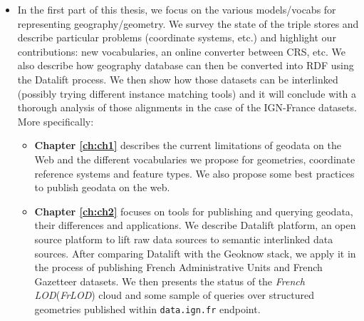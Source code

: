 \begin{itemize}
\item In the first part of this thesis, we focus on the various models/vocabs for representing geography/geometry. We survey the state of the triple stores and describe particular problems (coordinate systems, etc.) and highlight our contributions: new vocabularies, an online converter between CRS, etc. We also describe how geography database can then be converted into RDF using the Datalift process. We then show how those datasets can be interlinked (possibly trying different instance matching tools) and it will conclude with a thorough analysis of those alignments in the case of the IGN-France datasets. More specifically:

 \begin{itemize}
  \item \textbf{Chapter \ref{ch:ch1}} describes the current limitations of geodata on the Web and the different vocabularies we propose for geometries, coordinate reference systems and feature  types. We also propose  some best practices to publish geodata on the web.
  \item \textbf{Chapter \ref{ch:ch2}} focuses on tools for publishing and querying geodata, their differences and applications. We describe Datalift platform, an open source platform to lift raw data sources to semantic interlinked data sources. After comparing Datalift with the Geoknow stack, we apply it in the process of publishing French Administrative Units and French Gazetteer datasets. We then presents the status of the \textit{French LOD}(\textit{FrLOD}) cloud and some sample of queries over structured geometries published within \texttt{data.ign.fr} endpoint. 
 \end{itemize}


\end{itemize}
